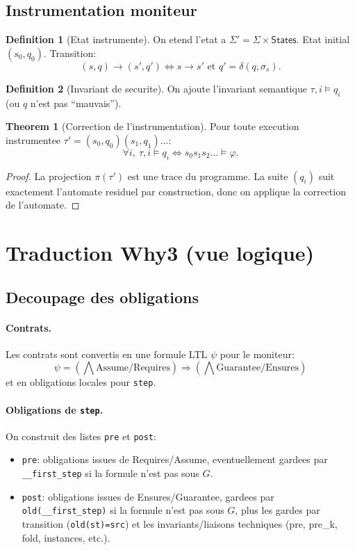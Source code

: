 \documentclass[11pt]{article}
\newcommand{\eval}{\models}
\newcommand{\states}{\mathsf{States}}
\newcommand{\deltaa}{\delta}
\theoremstyle{definition}
\newtheorem{definition}{Definition}
\newtheorem{theorem}{Theorem}
\begin{document}
\subsection{Instrumentation moniteur}

\begin{definition}[Etat instrumente]
On etend l'etat a $\Sigma'=\Sigma \times \states$.
Etat initial $(s_0,q_0)$.
Transition:
\[
(s,q)\rightarrow (s',q') \iff s\rightarrow s' \text{ et } q'=\deltaa(q,\sigma_s).
\]
\end{definition}

\begin{definition}[Invariant de securite]
On ajoute l'invariant semantique $\tau,i \eval q_i$ (ou $q$ n'est pas ``mauvais'').
\end{definition}

\begin{theorem}[Correction de l'instrumentation]
Pour toute execution instrumentee $\tau'=(s_0,q_0)(s_1,q_1)\ldots$:
\[
\forall i,\ \tau,i \eval q_i \iff s_0 s_1 s_2 \ldots \eval \varphi.
\]
\end{theorem}
\begin{proof}
La projection $\pi(\tau')$ est une trace du programme. La suite $(q_i)$ suit
exactement l'automate residuel par construction, donc on applique la correction
de l'automate.
\end{proof}

\section{Traduction Why3 (vue logique)}

\subsection{Decoupage des obligations}

\paragraph{Contrats.} Les contrats sont convertis en une formule LTL
$\psi$ pour le moniteur:
\[
\psi = (\bigwedge \text{Assume/Requires}) \Rightarrow (\bigwedge \text{Guarantee/Ensures})
\]
et en obligations locales pour \texttt{step}.

\paragraph{Obligations de \texttt{step}.}
On construit des listes \texttt{pre} et \texttt{post}:
\begin{itemize}
\item \texttt{pre}: obligations issues de Requires/Assume, eventuellement gardees
par \texttt{\_\_first\_step} si la formule n'est pas sous $G$.
\item \texttt{post}: obligations issues de Ensures/Guarantee, gardees par
\texttt{old(\_\_first\_step)} si la formule n'est pas sous $G$, plus les gardes
par transition (\texttt{old(st)=src}) et les invariants/liaisons techniques
(pre, pre\_k, fold, instances, etc.).
\end{itemize}
\end{document}
